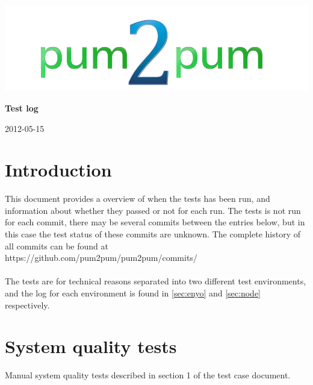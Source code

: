 \documentclass[a4paper, 12pt, titlepage]{article}
\begin{document}
	
	\begin{titlepage}
		
		\includegraphics[scale=0.4]{logoNormal.png}
		
		\vspace{6cm}
		
		\begin{center}
			\Huge{\textbf{Test log}} %
			
			\vspace{0.5cm}
			
			\huge{2012-05-15} %
		\end{center}
		
	\end{titlepage}
	
	\newpage


	\section{Introduction}
	This document provides a overview of when the tests has been run, and  information about whether they passed or not for each run. The tests is not run for each commit, there may be several commits between the entries below, but in this case the test status of these commits are unknown. The complete history of all commits can be found at\\

	https://github.com/pum2pum/pum2pum/commits/\\\\
	The tests are for technical reasons separated into two different test environments, and the log for each environment is found in \autoref{sec:enyo} and \autoref{sec:node} respectively.\\


	\section{System quality tests}
	\label{sec:quality}
	Manual system quality tests described in section 1 of the test case document.\\
\end{document}
